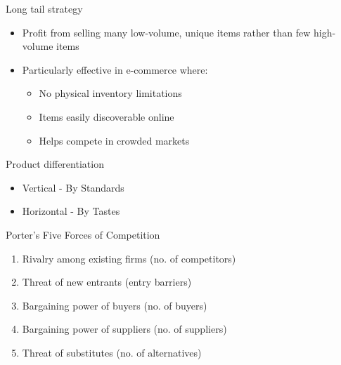 \begin{theorem}
    {Long tail strategy}
    \begin{itemize}
        \item Profit from selling many low-volume, unique items rather than few high-volume items
        \item Particularly effective in e-commerce where:
              \begin{itemize}
                  \item No physical inventory limitations
                  \item Items easily discoverable online
                  \item Helps compete in crowded markets
              \end{itemize}
    \end{itemize}
\end{theorem}

\begin{theorem}
    {Product differentiation}
    \begin{itemize}
        \item Vertical - By Standards
        \item Horizontal - By Tastes
    \end{itemize}
\end{theorem}

\begin{theorem}
    {Porter's Five Forces of Competition}
    \begin{enumerate}
        \item Rivalry among existing firms (no. of competitors)
        \item Threat of new entrants (entry barriers)
        \item Bargaining power of buyers (no. of buyers)
        \item Bargaining power of suppliers (no. of suppliers)
        \item Threat of substitutes (no. of alternatives)
    \end{enumerate}
\end{theorem}
